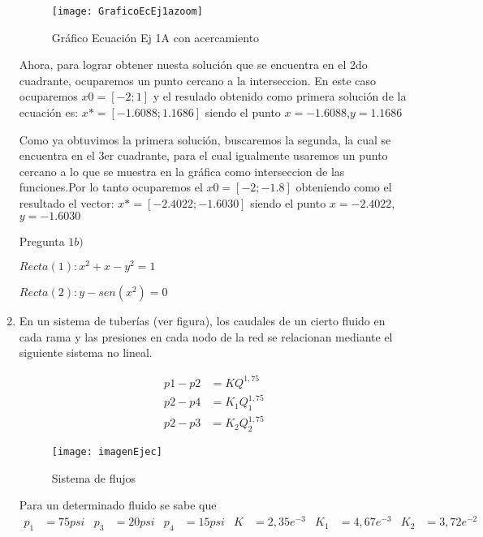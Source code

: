 \documentclass{udpreport}
\begin{document}
\begin{enumerate}
            \begin{figure}[H]
               \centering   \texttt{[image: GraficoEcEj1azoom]}
                \caption{Gráfico Ecuación Ej 1A con acercamiento}
            \end{figure}
            Ahora, para lograr obtener nuesta solución que se encuentra en el 2do cuadrante, ocuparemos un punto cercano a la interseccion. En este caso ocuparemos $ x0=[-2;1] $ y el resulado obtenido como primera solución de la ecuación es:
            $ x*=[-1.6088;1.1686 ]$ siendo el punto  $x = -1.6088$,$y = 1.1686$
            
            Como ya obtuvimos la primera solución, buscaremos la segunda, la cual se encuentra en el 3er cuadrante, para el cual igualmente usaremos un punto cercano a lo que se muestra en la gráfica como interseccion de las funciones.Por lo tanto ocuparemos el $x0=[-2;-1.8] $ obteniendo como el resultado el vector:
            $x*=[-2.4022;-1.6030]$ siendo el punto $x=-2.4022$, $y=-1.6030$

        \newpage    
        Pregunta $ 1b)$
        
            $ Recta(1) : x^2 + x -y^2=1 $
            
            $ Recta(2) : y-sen(x^2)=0  $
            
            
    
        \newpage
        
        \item En un sistema de tuberías (ver figura), los caudales de un cierto fluido en cada rama y las presiones en cada nodo de la red se relacionan mediante el siguiente sistema no lineal.
        
        \begin{align*} 
            p1 - p2 &= KQ^{1,75} \\ 
            p2 - p4 &= K_1 Q_1^{1,75}\\
            p2 - p3 &= K_2 Q_2^{1,75}
        \end{align*}
        
    \begin{figure}[H]
    \centering
    \texttt{[image: imagenEjec]}
    \caption{Sistema de flujos}
    \end{figure}        
    
    Para un determinado fluido se sabe que
    \begin{align*}
    p_1&=75psi & p_3&=20psi &  p_4&=15psi & K&=2,35e^{-3} & K_1&=4,67e^{-3} & K_2&=3,72e^{-2}
    \end{align*}
    

\end{enumerate}
\end{document}
